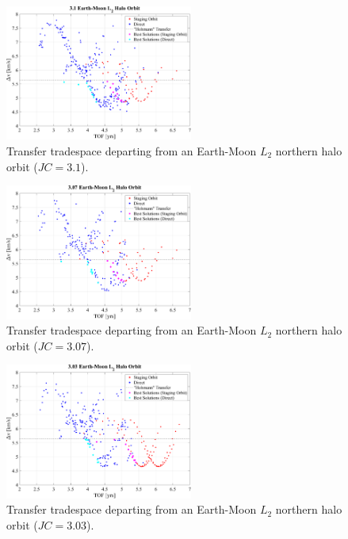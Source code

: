 \begin{figure}[ht]
    \centering
    \includegraphics[width=0.55\textwidth]{figures/TradeSpace_L2Halo_3_10.pdf}
    \caption{Transfer tradespace departing from an Earth-Moon $L_{2}$ northern halo orbit ($JC=3.1$).}
\end{figure}
\clearpage

\begin{figure}[ht]
    \centering
    \includegraphics[width=0.55\textwidth]{figures/TradeSpace_L2Halo_3_07.pdf}
    \caption{Transfer tradespace departing from an Earth-Moon $L_{2}$ northern halo orbit ($JC=3.07$).}
\end{figure}

\begin{figure}[ht]
    \centering
    \includegraphics[width=0.55\textwidth]{figures/TradeSpace_L2Halo_3_03.pdf}
    \caption{Transfer tradespace departing from an Earth-Moon $L_{2}$ northern halo orbit ($JC=3.03$).}
\end{figure}
\clearpage

